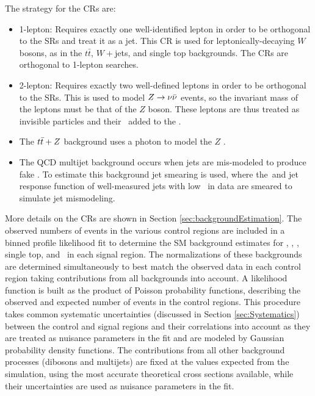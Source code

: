 
The strategy for the CRs are:

\begin{itemize}
	\item 1-lepton: Requires exactly one well-identified lepton in order to be orthogonal to the SRs and treat it as a jet.  This CR is used for leptonically-decaying $W$ bosons, as in the $t\bar{t}$, $W+$jets, and single top backgrounds.  The CRs are orthogonal to 1-lepton searches. 
	\item 2-lepton: Requires exactly two well-defined leptons in order to be orthogonal to the SRs.  This is used to model $Z\rightarrow \nu \bar{\nu}$ events, so the invariant mass of the leptons must be that of the $Z$ boson.  These leptons are thus treated as invisible particles and their \pt\ added to the \met.
	\item The $t\bar{t}+Z$ background uses a photon to model the $Z$ \pt.
	\item The QCD multijet background occurs when jets are mis-modeled to produce fake \met.  To estimate this background jet smearing\cite{jetSmearing} is used, where the\pt\ and jet response function of well-measured jets with low \met\ in data are smeared to simulate jet mismodeling.
\end{itemize} 



More details on the CRs are shown in Section \ref{sec:backgroundEstimation}.  The observed numbers of events in the various control regions are included in a binned profile likelihood fit\cite{likelihoodFit} to determine the SM background
estimates for \Zboson, \ttbar, \Wboson, single top, and \ttZ\ in each signal region. 
The normalizations of these backgrounds are determined simultaneously to best match the observed data in each control region taking contributions from all backgrounds into account. A likelihood function is built as the
product of Poisson probability functions, describing the observed and
expected number of events in the control regions\cite{histFitter}. This procedure takes common systematic uncertainties (discussed in
Section \ref{sec:Systematics}) between the control and signal regions and
their correlations into account as they are treated as nuisance
parameters in the fit and are modeled by Gaussian probability density
functions. %
The contributions from all other background processes (dibosons and multijets) are fixed at the values expected from
the simulation, using the most accurate theoretical cross sections
available, while their uncertainties are used as nuisance parameters in the fit. \\


